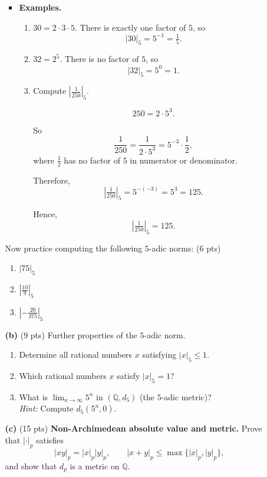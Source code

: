 \documentclass[12pt]{amsart}
\theoremstyle{definition}
\theoremstyle{remark}
\begin{document}
\begin{CJK}{UTF8}{bkai}
\begin{enumerate}
\begin{enumerate}
\begin{itemize}
\item \textbf{Examples.}
\begin{enumerate}
\item $30 = 2 \cdot 3 \cdot 5$. There is exactly one factor of $5$, so
\[
|30|_5 = 5^{-1} = \tfrac{1}{5}.
\]

\item $32 = 2^5$. There is no factor of $5$, so
\[
|32|_5 = 5^{0} = 1.
\]

\item Compute $\left|\tfrac{1}{250}\right|_5$.

\[
250 = 2 \cdot 5^3.
\]

So
\[
\frac{1}{250} = \frac{1}{2 \cdot 5^3} 
= 5^{-3} \cdot \frac{1}{2},
\]
where $\tfrac{1}{2}$ has no factor of $5$ in numerator or denominator.

Therefore,
\[
\left|\tfrac{1}{250}\right|_5 
= 5^{-(-3)} 
= 5^3 
= 125.
\]

Hence,
\[
\boxed{\;\;\left|\tfrac{1}{250}\right|_5 = 125.\;\;}
\]
\end{enumerate}
\end{itemize}

\medskip

Now practice computing the following $5$-adic norms:
 (6 pts) 
\begin{enumerate}
\item $|75|_5$
\item $\left|\tfrac{10}{9}\right|_5$
\item $\left|-\tfrac{20}{375}\right|_5$
\end{enumerate}

\medskip

\item[\textbf{(b)}]  (9 pts)  Further properties of the $5$-adic norm.
\begin{enumerate}
\item Determine all rational numbers $x$ satisfying $|x|_5\le 1$. 
\item Which rational numbers $x$ satisfy $|x|_5=1$?
\item What is $\lim_{n \to \infty} 5^n$ in $(\mathbb{Q}, d_5)$ (the $5$-adic metric)? \\
\emph{Hint:} Compute $d_5(5^n,0)$.
\end{enumerate}

\medskip

\item[\textbf{(c)}] (15 pts) \textbf{Non-Archimedean absolute value and metric.}  
Prove that $|\cdot|_p$ satisfies
\[
|xy|_p=|x|_p|y|_p,\qquad |x+y|_p\le \max\{|x|_p,|y|_p\},
\]
and show that $d_p$ is a metric on $\mathbb{Q}$.


\end{enumerate}
\end{enumerate}
\end{CJK}
\end{document}

